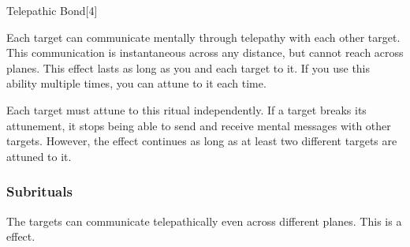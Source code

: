 \begin{spellsection}{Telepathic Bond}[4]

\begin{spellcontent}

\begin{spelltargetinginfo}



\end{spelltargetinginfo}


\begin{spelleffects}



\spelleffect
Each target can communicate mentally through telepathy with each other target.
This communication is instantaneous across any distance, but cannot reach across planes.
This effect lasts as long as you and each target  to it.
If you use this ability multiple times, you can attune to it each time.

Each target must attune to this ritual independently.
If a target breaks its attunement, it stops being able to send and receive mental messages with other targets.
However, the effect continues as long as at least two different targets are attuned to it.






\end{spelleffects}

\end{spellcontent}
\begin{spellfooter}


\end{spellfooter}
\begin{spellsubcontent}


\end{spellsubcontent}
\end{spellsection}


\subsubsection{Subrituals}



The targets can communicate telepathically even across different planes.
This is a  effect.






